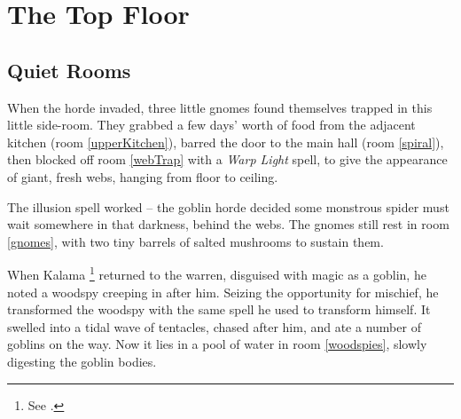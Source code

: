 \chapter{The Top Floor}
\epigraph{
  \iftoggle{hardcore}{
    I have township, yet no houses.
    Forests, but no trees.
    Rivers, but no water.
  }{
    Never resting, never still.

    Moving silently from hill to hill.

    It does not walk, run or trot.

    All is cool where it is not.
  }
}{}

\section{Quiet Rooms}
\label{upper}

\begin{exampletext}

  When the horde invaded, three little gnomes found themselves trapped in this little side-room.
  They grabbed a few days' worth of food from the adjacent kitchen (room \ref{upperKitchen}),
  barred the door to the main hall (room \ref{spiral}), then blocked off room \ref{webTrap} with a \textit{Warp Light} spell, to give the appearance of giant, fresh webs, hanging from floor to ceiling.

  The illusion spell worked -- the goblin horde decided some monstrous spider must wait somewhere in that darkness, behind the webs.
  The gnomes still rest in room \ref{gnomes}, with two tiny barrels of salted mushrooms to sustain them.

  When Kalama%
  \footnote{See .}
  returned to the warren, disguised with magic as a goblin, he noted a woodspy%
  \iftoggle{hardcore}{}%
  {\footnote{Woodspies are giant land-octopuses, which can change their colour and texture to ambush prey.}}
  creeping in after him.
  Seizing the opportunity for mischief, he transformed the woodspy with the same spell he used to transform himself.
  It swelled into a tidal wave of tentacles, chased after him, and ate a number of goblins on the way.
  Now it lies in a pool of water in room \ref{woodspies}, slowly digesting the goblin bodies.

\end{exampletext}

